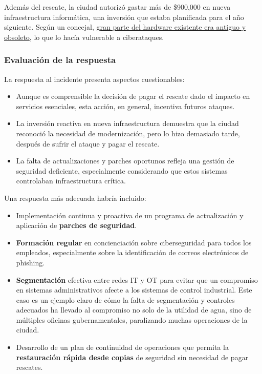 Además del rescate, la ciudad autorizó gastar más de \$900,000 en nueva infraestructura informática, una inversión que estaba planificada para el año siguiente. Según un concejal, \ul{gran parte del hardware existente era antiguo y obsoleto}, lo que lo hacía vulnerable a ciberataques.

\subsubsection{Evaluación de la respuesta}
La respuesta al incidente presenta aspectos cuestionables:

\begin{itemize}
    \item Aunque es comprensible la decisión de pagar el rescate dado el impacto en servicios esenciales, esta acción, en general, incentiva futuros ataques.
    
    \item La inversión reactiva en nueva infraestructura demuestra que la ciudad reconoció la necesidad de modernización, pero lo hizo demasiado tarde, después de sufrir el ataque y pagar el rescate.
    
    \item La falta de actualizaciones y parches oportunos refleja una gestión de seguridad deficiente, especialmente considerando que estos sistemas controlaban infraestructura crítica.
\end{itemize}

Una respuesta más adecuada habría incluido:

\begin{itemize}
    \item Implementación continua y proactiva de un programa de actualización y aplicación de \textbf{parches de seguridad}.
    
    \item \textbf{Formación regular} en concienciación sobre ciberseguridad para todos los empleados, especialmente sobre la identificación de correos electrónicos de phishing.
    
    \item \textbf{Segmentación} efectiva entre redes \textsc{IT} y \textsc{OT} para evitar que un compromiso en sistemas administrativos afecte a los sistemas de control industrial.
    Este caso es un ejemplo claro de cómo la falta de segmentación y controles adecuados ha llevado al compromiso no solo de la utilidad de agua, sino de múltiples oficinas gubernamentales, paralizando muchas operaciones de la ciudad.
    
    \item Desarrollo de un plan de continuidad de operaciones que permita la\textbf{ restauración rápida desde copias} de seguridad sin necesidad de pagar rescates.
\end{itemize}

